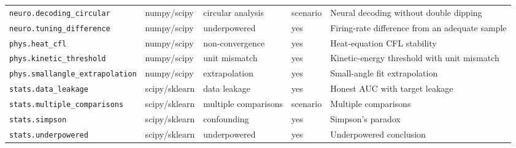 \begin{tabular}{@{}lllll@{}}
\texttt{neuro.decoding\_circular} & numpy/scipy & circular analysis & scenario & Neural decoding without double dipping \\
\texttt{neuro.tuning\_difference} & numpy/scipy & underpowered & yes & Firing-rate difference from an adequate sample \\
\texttt{phys.heat\_cfl} & numpy/scipy & non-convergence & yes & Heat-equation CFL stability \\
\texttt{phys.kinetic\_threshold} & numpy/scipy & unit mismatch & yes & Kinetic-energy threshold with unit mismatch \\
\texttt{phys.smallangle\_extrapolation} & numpy/scipy & extrapolation & yes & Small-angle fit extrapolation \\
\texttt{stats.data\_leakage} & scipy/sklearn & data leakage & yes & Honest AUC with target leakage \\
\texttt{stats.multiple\_comparisons} & scipy/sklearn & multiple comparisons & scenario & Multiple comparisons \\
\texttt{stats.simpson} & scipy/sklearn & confounding & yes & Simpson's paradox \\
\texttt{stats.underpowered} & scipy/sklearn & underpowered & yes & Underpowered conclusion \\
\bottomrule
\end{tabular}
